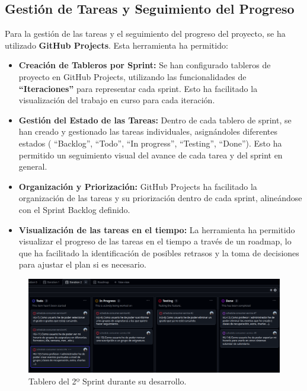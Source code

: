 \subsection{Gestión de Tareas y Seguimiento del Progreso}

Para la gestión de las tareas y el seguimiento del progreso del proyecto, se ha utilizado \textbf{GitHub Projects}. Esta herramienta ha permitido:

\begin{itemize}
    \item \textbf{Creación de Tableros por Sprint:} Se han configurado tableros de proyecto en GitHub Projects, utilizando las funcionalidades de \textbf{``Iteraciones''} para representar cada sprint. Esto ha facilitado la visualización del trabajo en curso para cada iteración.
    \item \textbf{Gestión del Estado de las Tareas:} Dentro de cada tablero de sprint, se han creado y gestionado las tareas individuales, asignándoles diferentes estados ( ``Backlog'', ``Todo'', ``In progress'', ``Testing'', ``Done''). Esto ha permitido un seguimiento visual del avance de cada tarea y del sprint en general.
    \item \textbf{Organización y Priorización:} GitHub Projects ha facilitado la organización de las tareas y su priorización dentro de cada sprint, alineándose con el Sprint Backlog definido.
    \item \textbf{Visualización de las tareas en el tiempo:} La herramienta ha permitido visualizar el progreso de las tareas en el tiempo a través de un roadmap, lo que ha facilitado la identificación de posibles retrasos y la toma de decisiones para ajustar el plan si es necesario.
\end{itemize}

\begin{figure}[h!] 
    \centering 
    \includegraphics[width=1\textwidth]{figures/04_github_tablero.png}
    \caption{Tablero del 2º Sprint durante su desarrollo.} %
    \label{tablero_github} %
\end{figure}

